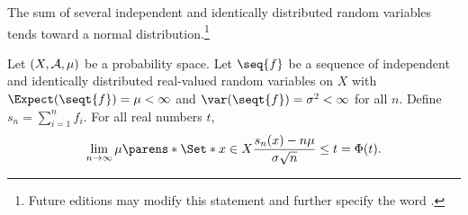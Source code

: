 

The sum of several
independent and
identically distributed
random variables tends
toward a normal distribution.\footnote{Future editions may modify this statement and further specify the word .}


\begin{prop}
Let $(X, \mathcal{A}, \mu)$
be a probability space.
Let $\seq{f}$ be a sequence
of independent and identically
distributed real-valued
random variables on $X$
with
$\Expect(\seqt{f}) = \mu < \infty$
and
$\var(\seqt{f}) = \sigma^2 < \infty$
for all $n$.
Define $s_n = \sum_{i = 1}^{n}f_i$.
For all real numbers $t$,
\[
  \lim_{n \to \infty}
  \mu\parens*{\Set*{
    x \in X
  }{
    \frac{
      s_n(x) - n\mu
    }{
      \sigma\sqrt{n}
    }
    \leq
    t
  }} = \Phi(t).
\]
\end{prop}
